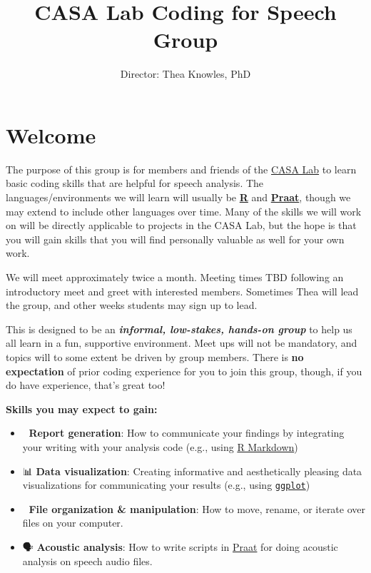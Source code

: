 \documentclass[
]{book}
\title{CASA Lab Coding for Speech Group}
\author{Director: Thea Knowles, PhD}
\date{}
\providecommand{\tightlist}{%
  \setlength{\itemsep}{0pt}\setlength{\parskip}{0pt}}
\begin{document}
\frontmatter
\maketitle

{
\setcounter{tocdepth}{1}
\tableofcontents
}
\mainmatter
\hypertarget{welcome}{%
\chapter*{Welcome}\label{welcome}}

The purpose of this group is for members and friends of the \href{https://casa-lab.netlify.com}{CASA Lab} to learn basic coding skills that are helpful for speech analysis. The languages/environments we will learn will usually be \href{https://www.r-project.org/}{\textbf{R}} and \href{http://www.fon.hum.uva.nl/praat/}{\textbf{Praat}}, though we may extend to include other languages over time. Many of the skills we will work on will be directly applicable to projects in the CASA Lab, but the hope is that you will gain skills that you will find personally valuable as well for your own work.

We will meet approximately twice a month. Meeting times TBD following an introductory meet and greet with interested members. Sometimes Thea will lead the group, and other weeks students may sign up to lead.

This is designed to be an \textbf{\emph{informal, low-stakes, hands-on group}} to help us all learn in a fun, supportive environment. Meet ups will not be mandatory, and topics will to some extent be driven by group members. There is \textbf{no expectation} of prior coding experience for you to join this group, though, if you do have experience, that's great too!

\textbf{Skills you may expect to gain:}

\begin{itemize}
\tightlist
\item
  📝 \textbf{Report generation}: How to communicate your findings by integrating your writing with your analysis code (e.g., using \href{https://bookdown.org/yihui/rmarkdown/}{R Markdown})
\item
  📊 \textbf{Data visualization}: Creating informative and aesthetically pleasing data visualizations for communicating your results (e.g., using \href{https://ggplot2.tidyverse.org/reference/ggplot.html}{\texttt{ggplot}})
\item
  📂 \textbf{File organization \& manipulation}: How to move, rename, or iterate over files on your computer.
\item
  🗣 \textbf{Acoustic analysis}: How to write scripts in \href{http://www.fon.hum.uva.nl/praat/}{Praat} for doing acoustic analysis on speech audio files.
\end{itemize}
\end{document}

